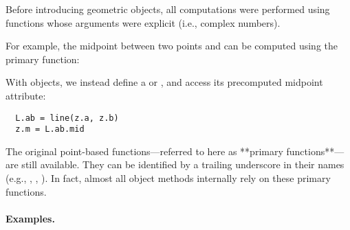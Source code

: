 Before introducing geometric objects, all computations were performed using functions whose arguments were explicit  (i.e., complex numbers).

For example, the midpoint between two points  and  can be computed using the primary function:
\begin{center}
\end{center}

With objects, we instead define a  or , and access its precomputed midpoint attribute:

\begin{center}
\begin{minipage}{0.5\textwidth}
\begin{mybox}
\begin{verbatim}
  L.ab = line(z.a, z.b)
  z.m = L.ab.mid
\end{verbatim}
\end{mybox}
\end{minipage}
\end{center}

\vspace{1em}
The original point-based functions—referred to here as **primary functions**—are still available. They can be identified by a trailing underscore in their names (e.g., , , ). In fact, almost all object methods internally rely on these primary functions.

\paragraph{Examples.}

